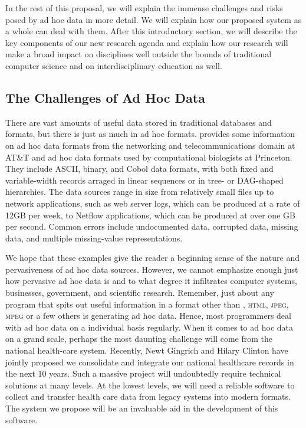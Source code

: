\documentclass[11pt]{article}
\begin{document}
In the rest of this proposal, we will explain the immense
challenges and risks posed by ad hoc data in more detail.  We will
explain how our proposed system as a whole can deal with them.   
After this introductory section, we will describe the
key components of our new research agenda and explain how our research
will make a broad impact on disciplines well outside the bounds of
traditional computer science and on interdisciplinary education as well.

\subsection{The Challenges of Ad Hoc Data}

There are vast amounts of useful data stored in
traditional databases and \xml{} formats, but there is just as much in
ad hoc formats.   provides some information
on ad hoc data formats from the networking and telecommunications domain at AT\&T
and ad hoc data formats used by computational biologists at Princeton.  
They include ASCII, binary, and Cobol data formats, with
both fixed and variable-width records arraged in linear sequences or in
tree- or DAG-shaped hierarchies.  The data sources range in size from
relatively small files up to network applications, such as web server logs,
which can be produced at a rate of 12GB per week, to Netflow applications, which 
can be produced at over one GB per second.  Common errors include undocumented data,
corrupted data, missing data, and multiple missing-value
representations.   

We hope that these examples give the reader a beginning sense of the nature and
pervasiveness of ad hoc data sources.  However, we cannot emphasize enough just how
pervasive ad hoc data is and to what degree it infiltrates computer systems, businesses, government,
and scientific research.  Remember, just about any program that spits out useful information
in a format other than \xml{}, \textsc{html}, \textsc{jpeg}, \textsc{mpeg} or a few others
is generating ad hoc data.  Hence, most programmers deal with ad hoc data on a
individual basis regularly.  When it comes to ad hoc data on a grand scale, perhaps the most
daunting challenge will  come from the national health-care system.  Recently, Newt Gingrich and 
Hilary Clinton have jointly proposed we 
consolidate and integrate our national healthcare records in the next 10 years.  
Such a massive project will undoubtedly require technical solutions at many levels.  At the
lowest levels, we will need a reliable software to collect and transfer health care
data from legacy systems into modern formats.  The \datatype{} system we propose
will be an invaluable aid in the development of this software.
\end{document}
